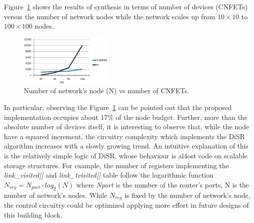 Figure~\ref{fig:imp_trend} shows the results of synthesis in
terms of number of devices (CNFETs) versus the number of network nodes
while the network scales up from $10\times10$ to $100\times100$ nodes.
\begin{figure}
  \centering
  \includegraphics[width=0.40\textwidth]{pictures/imp_rslt.eps}
  \caption{Number of network's node (N) vs number of CNFETs.}
 \label{fig:imp_trend}
\end{figure}
In particular, observing the Figure~\ref{fig:imp_trend} can 
be pointed out that the proposed implementation occupies about 17\% of the node budget. 
Further, more than the absolute number of devices itself, it is interesting to
observe that, while the node have a squared increment, the circuitry
complexity which implements the DiSR algorithm increases with a slowly
growing trend.  
An intuitive explanation of this is the relatively simple logic of
DiSR, whose behaviour is al4ost code on scalable storage structures.
For example, the number of registers
implementing the \emph{link\_visited[]} and \emph{link\_tvisited[]}
table follow the logarithmic function $N_{reg}=N_{port} \cdot
log_2(N)$ where \emph{Nport} is the number of the router’s ports, N is
the number of network’s nodes.  While $N_{reg}$ is fixed by the number
of network’s node,  the control circuitry could be optimized applying
more effort in future designs of this building block.

